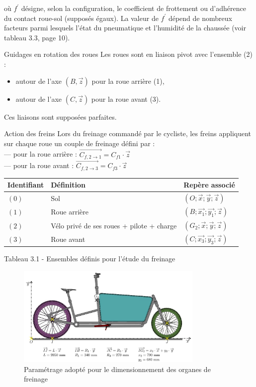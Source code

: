 {{où \(f^{\prime}\) désigne, selon la configuration, le coefficient de frottement ou d'adhérence du contact roue-sol (supposés égaux). La valeur de \(f^{\prime}\) dépend de nombreux facteurs parmi lesquels l'état du pneumatique et l'humidité de la chaussée (voir tableau 3.3, page 10).

Guidages en rotation des roues Les roues sont en liaison pivot avec l'ensemble (2) :

\begin{itemize}
  \item autour de l'axe \((B, \vec{z})\) pour la roue arrière (1),
  \item autour de l'axe \((C, \vec{z})\) pour la roue avant (3).
\end{itemize}

Ces liaisons sont supposées parfaites.

Action des freins Lors du freinage commandé par le cycliste, les freins appliquent sur chaque roue un couple de freinage défini par :\\
— pour la roue arrière : \(\overrightarrow{C_{f, 2 \rightarrow 1}}=C_{f 1} \cdot \vec{z}\)\\
— pour la roue avant : \(\overrightarrow{C_{f, 2 \rightarrow 3}}=C_{f 3} \cdot \vec{z}\)

\begin{center}
\begin{tabular}{lll}
Identifiant & Définition & Repère associé \\
\hline
\((0)\) & Sol & \((O ; \vec{x} ; \vec{y} ; \vec{z})\) \\
\((1)\) & Roue arrière & \(\left(B ; \overrightarrow{x_{1}} ; \overrightarrow{y_{1}} ; \vec{z}\right)\) \\
\((2)\) & Vélo privé de ses roues + pilote + charge & \(\left(G_{2} ; \vec{x} ; \vec{y} ; \vec{z}\right)\) \\
\((3)\) & Roue avant & \(\left(C ; \overrightarrow{x_{3}} ; \overrightarrow{y_{3}} ; \vec{z}\right)\) \\
\hline
\end{tabular}
\end{center}

Tableau 3.1 - Ensembles définis pour l'étude du freinage\\

\begin{figure}[!htb]
\begin{center}
\includegraphics[width=0.8\textwidth]{images/2024_12_06_8b2ce2e701dae8972925g-08}
\caption{Paramétrage adopté pour le dimensionnement des organes de freinage \label{fig5}}
\end{center}
\end{figure}

}}
